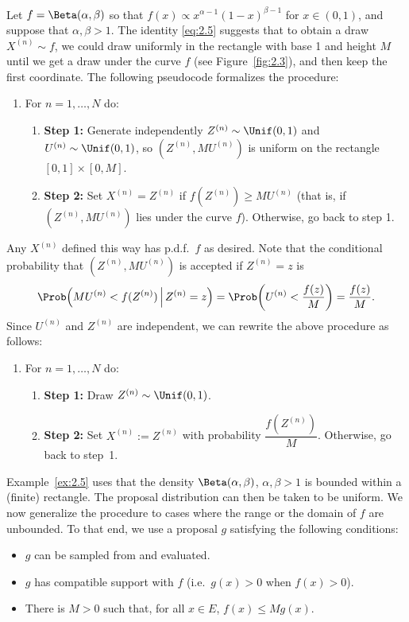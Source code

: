 \begin{example}
\label{ex:2.5}
Let $f = \Beta(\alpha, \beta)$ so that $f(x) \propto
x^{\alpha-1}(1-x)^{\beta-1}$ for $x \in (0,1)$, and suppose that $\alpha, \beta > 1$. The identity \eqref{eq:2.5} suggests that to
obtain a draw $X^{(n)} \sim f$, we could draw uniformly in the rectangle with base 1 and height $M$
until we get a draw under the curve $f$ (see Figure~\ref{fig:2.3}), and then keep the first coordinate. The
following pseudocode formalizes the procedure:

\begin{enumerate}
  \item For $n = 1, \ldots, N$ do:
  \begin{enumerate}
    \item \textbf{Step 1:} Generate independently $Z^{(n)} \sim \Unif(0,1)$ and $U^{(n)} \sim \Unif(0,1)$, so $(Z^{(n)}, MU^{(n)})$ is uniform on the rectangle $[0,1] \times [0,M]$.
    \item \textbf{Step 2:} Set $X^{(n)} = Z^{(n)}$ if $f(Z^{(n)}) \ge MU^{(n)}$ (that is, if $(Z^{(n)}, MU^{(n)})$ lies under the curve $f$). Otherwise, go back to step 1.
  \end{enumerate}
\end{enumerate}

Any $X^{(n)}$ defined this way has p.d.f.\ $f$ as desired. Note that the conditional probability that
$(Z^{(n)}, MU^{(n)})$ is accepted if $Z^{(n)} = z$ is
\[
  \Prob\!\left(MU^{(n)} < f(Z^{(n)}) \,\Big|\, Z^{(n)} = z\right) = \Prob\!\left(U^{(n)} < \frac{f(z)}{M}\right) = \frac{f(z)}{M}.
\]
Since $U^{(n)}$ and $Z^{(n)}$ are independent, we can rewrite the above procedure as follows:

\medskip
\begin{enumerate}
  \item For $n = 1, \ldots, N$ do:
  \begin{enumerate}
    \item \textbf{Step 1:} Draw $Z^{(n)} \sim \Unif(0,1)$.
    \item \textbf{Step 2:} Set $X^{(n)} := Z^{(n)}$ with probability $\dfrac{f(Z^{(n)})}{M}$. Otherwise, go back to step~1.
  \end{enumerate}
\end{enumerate}
\medskip

\end{example}

Example~\ref{ex:2.5} uses that the density $\Beta(\alpha,\beta)$, $\alpha, \beta > 1$ is bounded within a (finite) rectangle.
The proposal distribution can then be taken to be uniform. We now generalize the procedure
to cases where the range or the domain of $f$ are unbounded. To that end, we use a proposal $g$
satisfying the following conditions:
\begin{itemize}
  \item $g$ can be sampled from and evaluated.
  \item $g$ has compatible support with $f$ (i.e.\ $g(x) > 0$ when $f(x) > 0$).
  \item There is $M > 0$ such that, for all $x \in E$, $f(x) \le Mg(x)$.
\end{itemize}

